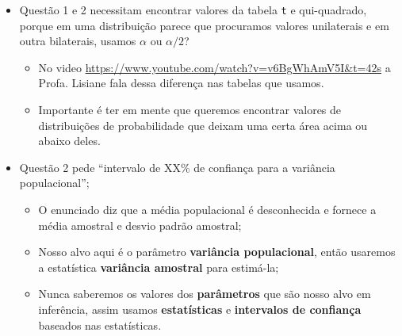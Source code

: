 \documentclass[
]{article}
\providecommand{\tightlist}{%
  \setlength{\itemsep}{0pt}\setlength{\parskip}{0pt}}
\begin{document}
\begin{itemize}
\tightlist
\item
  Questão 1 e 2 necessitam encontrar valores da tabela \texttt{t} e
  qui-quadrado, porque em uma distribuição parece que procuramos valores
  unilaterais e em outra bilaterais, usamos \(\alpha\) ou \(\alpha/2\)?

  \begin{itemize}
  \tightlist
  \item
    No video \url{https://www.youtube.com/watch?v=v6BgWhAmV5I\&t=42s} a
    Profa. Lisiane fala dessa diferença nas tabelas que usamos.
  \item
    Importante é ter em mente que queremos encontrar valores de
    distribuições de probabilidade que deixam uma certa área acima ou
    abaixo deles.
  \end{itemize}
\item
  Questão 2 pede ``intervalo de XX\% de confiança para a variância
  populacional'';

  \begin{itemize}
  \tightlist
  \item
    O enunciado diz que a média populacional é desconhecida e fornece a
    média amostral e desvio padrão amostral;
  \item
    Nosso alvo aqui é o parâmetro \textbf{variância populacional}, então
    usaremos a estatística \textbf{variância amostral} para estimá-la;
  \item
    Nunca saberemos os valores dos \textbf{parâmetros} que são nosso
    alvo em inferência, assim usamos \textbf{estatísticas} e
    \textbf{intervalos de confiança} baseados nas estatísticas.
  \end{itemize}
\end{itemize}
\end{document}
